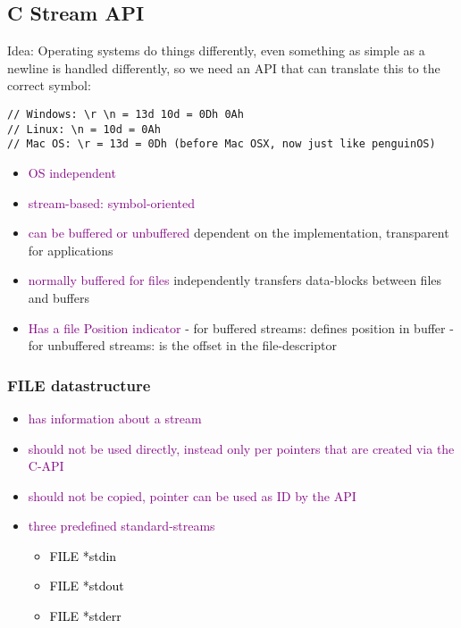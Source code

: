 \documentclass[main.tex,fontsize=8pt,paper=a4,paper=portrait,DIV=calc,]{scrartcl}
\begin{document}
\subsection{C Stream API}
Idea: Operating systems do things differently, even something as simple as a newline is handled differently, so we need an API that can translate this to the correct symbol:\newline
\begin{lstlisting}
// Windows: \r \n = 13d 10d = 0Dh 0Ah
// Linux: \n = 10d = 0Ah
// Mac OS: \r = 13d = 0Dh (before Mac OSX, now just like penguinOS)
\end{lstlisting}
\begin{itemize}
\item \textcolor{purple}{OS independent}
\item \textcolor{purple}{stream-based: symbol-oriented}
\item \textcolor{purple}{can be buffered or unbuffered}\newline
  dependent on the implementation, transparent for applications
\item \textcolor{purple}{normally buffered for files}\newline
  independently transfers data-blocks between files and buffers
\item \textcolor{purple}{Has a file Position indicator}\newline
  - for buffered streams: defines position in buffer\newline
  - for unbuffered streams: is the offset in the file-descriptor
\end{itemize} 

\subsubsection{FILE datastructure}
\begin{itemize}
\item \textcolor{purple}{has information about a stream}
\item \textcolor{purple}{should not be used directly, instead only per pointers that are created via the C-API}
\item \textcolor{purple}{should not be copied, pointer can be used as ID by the API}
\item \textcolor{purple}{three predefined standard-streams}\newline
  \begin{itemize}
  \item \textcolor{black}{FILE *stdin}
  \item \textcolor{black}{FILE *stdout}
  \item \textcolor{black}{FILE *stderr}
  \end{itemize} 
\end{itemize} 
\end{document}
